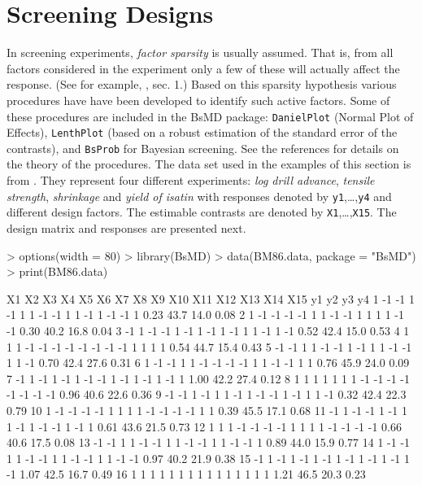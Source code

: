 \documentclass[letterpaper]{article}
\begin{document}
\section{Screening Designs\label{sec:ScreeningDesigns}}

In screening experiments, \emph{factor sparsity} is usually assumed. That is,
from all factors considered in the experiment only a few of these will
actually affect the response. (See for example, \citet{Box&Meyer-1986}, sec.
1.) Based on this sparsity hypothesis various procedures have have been
developed to identify such active factors. Some of these procedures are
included in the \textsf{BsMD} package: \texttt{DanielPlot} (Normal Plot of
Effects), \texttt{LenthPlot} (based on a robust estimation of the standard
error of the contrasts), and \texttt{BsProb} for Bayesian screening. See the
references for details on the theory of the procedures. The data set used in
the examples of this section is from \citet{Box&Meyer-1986}. They represent
four different experiments: \emph{log drill advance}, \emph{tensile
strength}, \emph{shrinkage} and \emph{yield of isatin} with responses denoted
by \texttt{y1},\dots,\texttt{y4} and different design factors. The estimable
contrasts are denoted by \texttt{X1},\dots,\texttt{X15}. The design matrix
and responses are presented next.

\begin{Schunk}
\begin{Sinput}
> options(width = 80)
> library(BsMD)
> data(BM86.data, package = "BsMD")
> print(BM86.data)
\end{Sinput}
\begin{Soutput}
   X1 X2 X3 X4 X5 X6 X7 X8 X9 X10 X11 X12 X13 X14 X15   y1   y2   y3   y4
1  -1 -1  1 -1  1  1 -1 -1  1   1  -1   1  -1  -1   1 0.23 43.7 14.0 0.08
2   1 -1 -1 -1 -1  1  1 -1 -1   1   1   1   1  -1  -1 0.30 40.2 16.8 0.04
3  -1  1 -1 -1  1 -1  1 -1  1  -1   1   1  -1   1  -1 0.52 42.4 15.0 0.53
4   1  1  1 -1 -1 -1 -1 -1 -1  -1  -1   1   1   1   1 0.54 44.7 15.4 0.43
5  -1 -1  1  1 -1 -1  1 -1  1   1  -1  -1   1   1  -1 0.70 42.4 27.6 0.31
6   1 -1 -1  1  1 -1 -1 -1 -1   1   1  -1  -1   1   1 0.76 45.9 24.0 0.09
7  -1  1 -1  1 -1  1 -1 -1  1  -1   1  -1   1  -1   1 1.00 42.2 27.4 0.12
8   1  1  1  1  1  1  1 -1 -1  -1  -1  -1  -1  -1  -1 0.96 40.6 22.6 0.36
9  -1 -1  1 -1  1  1 -1  1 -1  -1   1  -1   1   1  -1 0.32 42.4 22.3 0.79
10  1 -1 -1 -1 -1  1  1  1  1  -1  -1  -1  -1   1   1 0.39 45.5 17.1 0.68
11 -1  1 -1 -1  1 -1  1  1 -1   1  -1  -1   1  -1   1 0.61 43.6 21.5 0.73
12  1  1  1 -1 -1 -1 -1  1  1   1   1  -1  -1  -1  -1 0.66 40.6 17.5 0.08
13 -1 -1  1  1 -1 -1  1  1 -1  -1   1   1  -1  -1   1 0.89 44.0 15.9 0.77
14  1 -1 -1  1  1 -1 -1  1  1  -1  -1   1   1  -1  -1 0.97 40.2 21.9 0.38
15 -1  1 -1  1 -1  1 -1  1 -1   1  -1   1  -1   1  -1 1.07 42.5 16.7 0.49
16  1  1  1  1  1  1  1  1  1   1   1   1   1   1   1 1.21 46.5 20.3 0.23
\end{Soutput}
\end{Schunk}
\end{document}
